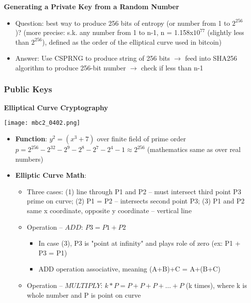 \documentclass[english, 11pt]{article}
\begin{document}
\noindent \textbf{Generating a Private Key from a Random Number}
\begin{itemize}
    \item Question: best way to produce 256 bits of entropy (or number from 1 to $2^{256}$)? (more precise: s.k. any number from 1 to n-1, n = 1.158x$10^{77}$ (slightly less than $2^{256}$), defined as the order of the elliptical curve used in bitcoin)
    \item Answer: Use CSPRNG to produce string of 256 bits $\rightarrow$ feed into SHA256 algorithm to produce 256-bit number $\rightarrow$ check if less than n-1
\end{itemize}

\subsubsection{Public Keys}
\textbf{Elliptical Curve Cryptography}
\begin{tcolorbox}
\begin{minipage}{0.3\linewidth}
\centering
    \texttt{[image: mbc2\_0402.png]}
    \captionsetup{justification=centering}
\end{minipage}\hfil
\begin{minipage}{0.7\linewidth}
\begin{itemize}
    \item \textbf{Function}: $y^2 = (x^3 + 7)$ over finite field of prime order $p = 2^{256}-2^{32}-2^9-2^8-2^7-2^4-1 \approx 2^{256}$ (mathematics same as over real numbers)
    \item \textbf{Elliptic Curve Math}:
    \begin{itemize}
        \item Three cases: (1) line through P1 and P2 -- must intersect third point P3 prime on curve; (2) P1 = P2 -- intersects second point P3; (3) P1 and P2 same x coordinate, opposite y coordinate -- vertical line
        \item Operation -- $ADD$: $P3 = P1 + P2$
        \begin{itemize}
            \item In case (3), P3 is "point at infinity" and plays role of zero (ex: P1 + P3 = P1)
            \item ADD operation associative, meaning (A+B)+C = A+(B+C)
        \end{itemize}
        \item Operation -- $MULTIPLY$: $k*P = P + P + P + ... + P$ (k times), where k is whole number and P is point on curve
    \end{itemize}
\end{itemize}
\end{minipage}
\end{tcolorbox}
\end{document}
